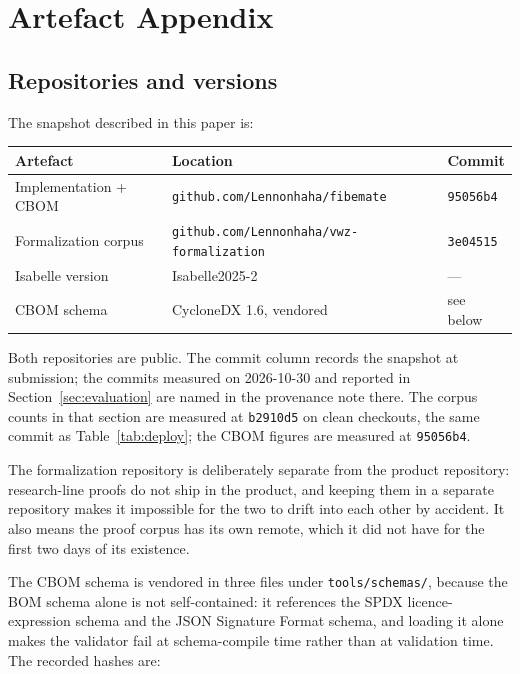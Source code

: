 \section{Artefact Appendix}
\label{app:artefacts}

\subsection{Repositories and versions}

The snapshot described in this paper is:

\begin{center}
\begin{tabular}{@{}lll@{}}
\toprule
Artefact & Location & Commit \\
\midrule
Implementation + CBOM & \texttt{github.com/Lennonhaha/fibemate} & \texttt{95056b4} \\
Formalization corpus & \texttt{github.com/Lennonhaha/vwz-formalization} & \texttt{3e04515} \\
Isabelle version & Isabelle2025-2 & --- \\
CBOM schema & CycloneDX 1.6, vendored & see below \\
\bottomrule
\end{tabular}
\end{center}

Both repositories are public. The commit column records the snapshot at
submission; the commits measured on 2026-10-30 and reported in
Section~\ref{sec:evaluation} are named in the provenance note there. The corpus
counts in that section are measured at \texttt{b2910d5} on clean checkouts, the
same commit as Table~\ref{tab:deploy}; the CBOM figures are measured at
\texttt{95056b4}.

The formalization repository is deliberately
separate from the product repository: research-line proofs do not ship in the
product, and keeping them in a separate repository makes it impossible for the
two to drift into each other by accident. It also means the proof corpus has its
own remote, which it did not have for the first two days of its existence.

The CBOM schema is vendored in three files under \texttt{tools/schemas/},
because the BOM schema alone is not self-contained: it references the SPDX
licence-expression schema and the JSON Signature Format schema, and loading it
alone makes the validator fail at schema-compile time rather than at validation
time. The recorded hashes are:

